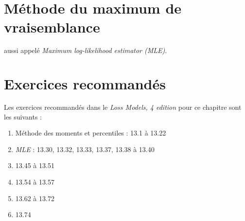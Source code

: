 \documentclass[12pt, french]{report}
\begin{document}
\section{Méthode du maximum de vraisemblance}
aussi appelé \emph{Maximum log-likelihood estimator (MLE)}. 



\section{Exercices recommandés}
Les exercices recommandés dans le \emph{Loss Models, 4 edition} pour ce chapitre sont les suivants : 
\begin{enumerate}[label=\faAngleRight]
\item Méthode des moments et percentiles : 13.1 à 13.22
\item \emph{MLE} : 13.30, 13.32, 13.33, 13.37, 13.38 à 13.40
\item 13.45 à 13.51
\item 13.54 à 13.57
\item 13.62 à 13.72
\item 13.74 
\end{enumerate}
\end{document}
